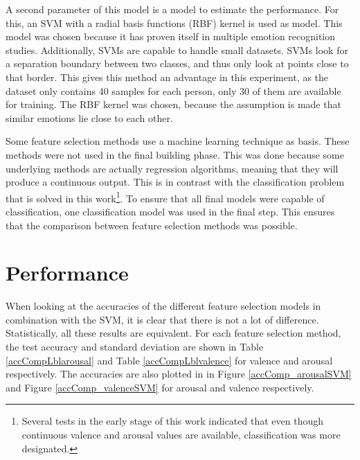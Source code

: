 \npar
A second parameter of this model is a model to estimate the performance. For this, an SVM with a radial basis functions (RBF) kernel is used as model. This model was chosen because it has proven itself in multiple emotion recognition studies\citep{killyPaper,emorecoghard}. Additionally, SVMs are capable to handle small datasets. SVMs look for a separation boundary between two classes, and thus only look at points close to that border. This gives this method an advantage in this experiment, as the dataset only contains 40 samples for each person, only 30 of them are available for training. The RBF kernel was chosen, because the assumption is made that similar emotions lie close to each other. 

\npar

Some feature selection methods use a machine learning technique as basis. These methods were not used in the final building phase. This was done because some underlying methods are actually regression algorithms, meaning that they will produce a continuous output. This is in contrast with the classification problem that is solved in this work\footnote{Several tests in the early stage of this work indicated that even though continuous valence and arousal values are available, classification was more designated.}. To ensure that all final models were capable of classification, one classification model was used in the final step. This ensures that the comparison between feature selection methods was possible.

\section{Performance}

When looking at the accuracies of the different feature selection models in combination with the SVM, it is clear that there is not a lot of difference. Statistically, all these results are equivalent.
For each feature selection method, the test accuracy and standard deviation are shown in Table \ref{accCompLblarousal} and Table \ref{accCompLblvalence} for valence and arousal respectively. The accuracies are also plotted in in Figure \ref{accComp_arousalSVM} and Figure \ref{accComp_valenceSVM} for arousal and valence respectively.


